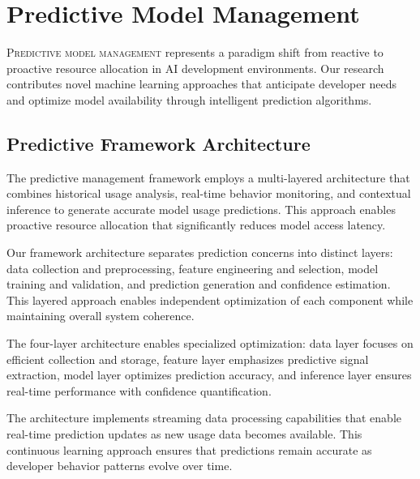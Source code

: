 
\section*{Predictive Model Management}

\lettrine{P}{redictive model management} represents a paradigm shift from reactive to proactive resource allocation in AI development environments. Our research contributes novel machine learning approaches that anticipate developer needs and optimize model availability through intelligent prediction algorithms.

\subsection*{Predictive Framework Architecture}

The predictive management framework employs a multi-layered architecture that combines historical usage analysis, real-time behavior monitoring, and contextual inference to generate accurate model usage predictions. This approach enables proactive resource allocation that significantly reduces model access latency.

Our framework architecture separates prediction concerns into distinct layers: data collection and preprocessing, feature engineering and selection, model training and validation, and prediction generation and confidence estimation. This layered approach enables independent optimization of each component while maintaining overall system coherence.

\begin{infobox}[title=Prediction Architecture Layers]
The four-layer architecture enables specialized optimization: data layer focuses on efficient collection and storage, feature layer emphasizes predictive signal extraction, model layer optimizes prediction accuracy, and inference layer ensures real-time performance with confidence quantification.
\end{infobox}

The architecture implements streaming data processing capabilities that enable real-time prediction updates as new usage data becomes available. This continuous learning approach ensures that predictions remain accurate as developer behavior patterns evolve over time.

